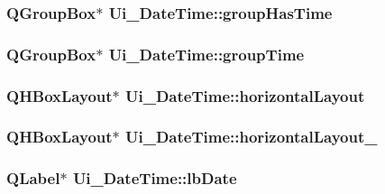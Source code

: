 \label{class_ui___date_time_aa589c9b11f049e55441921472edf5edb}
\hypertarget{class_ui___date_time_ae9887b3a8b4e56cf1cac0d542819c98d}{
\subsubsection[{groupHasTime}]{\setlength{\rightskip}{0pt plus 5cm}QGroupBox$\ast$ {\bf Ui\_\-DateTime::groupHasTime}}}
\label{class_ui___date_time_ae9887b3a8b4e56cf1cac0d542819c98d}
\hypertarget{class_ui___date_time_a0228c72e4210b7e2325f003f7b0525bd}{
\subsubsection[{groupTime}]{\setlength{\rightskip}{0pt plus 5cm}QGroupBox$\ast$ {\bf Ui\_\-DateTime::groupTime}}}
\label{class_ui___date_time_a0228c72e4210b7e2325f003f7b0525bd}
\hypertarget{class_ui___date_time_a2643fceafcdce6541af710a79f579301}{
\subsubsection[{horizontalLayout}]{\setlength{\rightskip}{0pt plus 5cm}QHBoxLayout$\ast$ {\bf Ui\_\-DateTime::horizontalLayout}}}
\label{class_ui___date_time_a2643fceafcdce6541af710a79f579301}
\hypertarget{class_ui___date_time_a4a83e6da2cb4777c714707d0ec9ef071}{
\subsubsection[{horizontalLayout\_\-2}]{\setlength{\rightskip}{0pt plus 5cm}QHBoxLayout$\ast$ {\bf Ui\_\-DateTime::horizontalLayout\_}}}
\label{class_ui___date_time_a4a83e6da2cb4777c714707d0ec9ef071}
\hypertarget{class_ui___date_time_a2c9c40ac284a6523d361201e4c0c2ec7}{
\subsubsection[{lbDate}]{\setlength{\rightskip}{0pt plus 5cm}QLabel$\ast$ {\bf Ui\_\-DateTime::lbDate}}}
